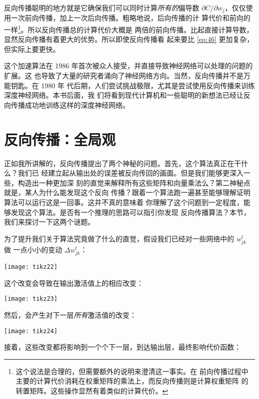反向传播聪明的地方就是它确保我们可以同时计算\emph{所有的}偏导数 $\partial
C/\partial w_j$，仅仅使用一次前向传播，加上一次后向传播。粗略地说，后向传播的计
算代价和前向的一样\footnote{这个说法是合理的，但需要额外的说明来澄清这一事实。在
  前向传播过程中主要的计算代价消耗在权重矩阵的乘法上，而反向传播则是计算权重矩阵
  的转置矩阵。这些操作显然有着类似的计算代价。}。所以反向传播总的计算代价大概是
两倍的前向传播。比起直接计算导数，显然反向传播有着更大的优势。所以即使反向传播看
起来要比 \eqref{eq:46} 更加复杂，但实际上要更快。

这个加速算法在 1986 年首次被众人接受，并直接导致神经网络可以处理的问题的扩展。这
也导致了大量的研究者涌向了神经网络方向。当然，反向传播并不是万能钥匙。在 1980 年
代后期，人们尝试挑战极限，尤其是尝试使用反向传播来训练深度神经网络。本书后面，我
们将看到现代计算机和一些聪明的新想法已经让反向传播成功地训练这样的深度神经网络。

\section{反向传播：全局观}
\label{sec:backpropagation_the_big_picture}

正如我所讲解的，反向传播提出了两个神秘的问题。首先，这个算法真正在干什么？我们已
经建立起从输出处的误差被反向传回的画面。但是我们能够更深入一些，构造出一种更加深
刻的直觉来解释所有这些矩阵和向量乘法么？第二神秘点就是，某人为什么能发现这个反向
传播？跟着一个算法跑一遍甚至能够理解证明算法可以运行这是一回事。这并不真的意味着
你理解了这个问题到一定程度，能够发现这个算法。是否有一个推理的思路可以指引你发现
反向传播算法？本节，我们来探讨一下这两个谜题。

为了提升我们关于算法究竟做了什么的直觉，假设我们已经对一些网络中的 $w_{jk}^l$ 做
一点小小的变动 $\Delta w_{jk}^l$：

\begin{center}
  \texttt{[image: tikz22]}
\end{center}

这个改变会导致在输出激活值上的相应改变：

\begin{center}
  \texttt{[image: tikz23]}
\end{center}

然后，会产生对下一层\emph{所有}激活值的改变：

\begin{center}
  \texttt{[image: tikz24]}
\end{center}

接着，这些改变都将影响到一个个下一层，到达输出层，最终影响代价函数：

